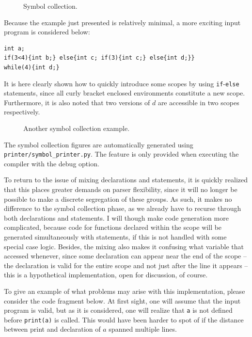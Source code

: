 \begin{figure}[H]
    \centering
    
    \caption{Symbol collection.} 
    \label{fig:symbol_collection}
\end{figure}

Because the example just presented is relatively minimal, a more exciting input program is considered below:

\begin{verbatim}
int a; 
if(3<4){int b;} else{int c; if(3){int c;} else{int d;}} 
while(4){int d;}
\end{verbatim}

It is here clearly shown how to quickly introduce some scopes by using \texttt{if}-\texttt{else} statements, since all curly bracket enclosed environments constitute a new scope. Furthermore, it is also noted that two versions of $d$ are accessible in two scopes respectively. 

\begin{figure}[H]
    \centering
    
    \caption{Another symbol collection example.} 
\end{figure}

The symbol collection figures are automatically generated using \texttt{printer/\-symbol\_printer.py}. The feature is only provided when executing the compiler with the debug option.

To return to the issue of mixing declarations and statements, it is quickly realized that this places greater demands on parser flexibility, since it will no longer be possible to make a discrete segregation of these groups. As such, it makes no difference to the symbol collection phase, as we already have to recurse through both declarations and statements. I will though make code generation more complicated, because code for functions declared within the scope will be generated simultaneously with statements, if this is not handled with some special case logic. Besides, the mixing also makes it confusing what variable that accessed whenever, since some declaration can appear near the end of the scope -- the declaration is valid for the entire scope and not just after the line it appears -- this is a hypothetical implementation, open for discussion, of course.

To give an example of what problems may arise with this implementation, please consider the code fragment below. At first sight, one will assume that the input program is valid, but as it is considered, one will realize that \texttt{a} is not defined before \texttt{print(a)} is called. This would have been harder to spot of if the distance between print and declaration of $a$ spanned multiple lines.

